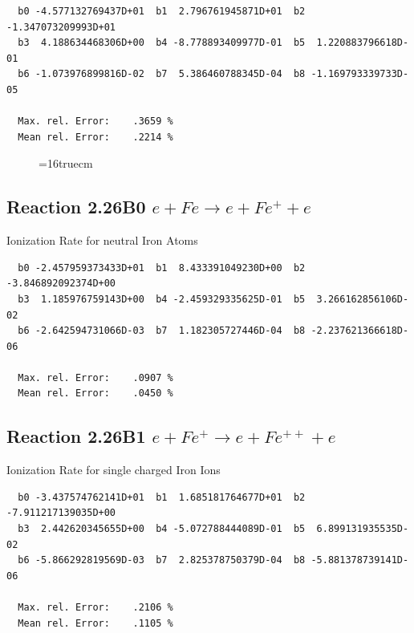 \documentclass[12pt,dvips]{article}
\begin{document}
\begin{small}\begin{verbatim}
  b0 -4.577132769437D+01  b1  2.796761945871D+01  b2 -1.347073209993D+01
  b3  4.188634468306D+00  b4 -8.778893409977D-01  b5  1.220883796618D-01
  b6 -1.073976899816D-02  b7  5.386460788345D-04  b8 -1.169793339733D-05

  Max. rel. Error:    .3659 %
  Mean rel. Error:    .2214 %

\end{verbatim}\end{small}


\begin{figure} \label{2.18B}
\epsfxsize=16truecm
\end{figure}
\newpage



\subsection{
Reaction 2.26B0   $e + Fe  \rightarrow e + Fe^+  + e$
}

  Ionization Rate for neutral Iron Atoms

\begin{small}\begin{verbatim}
  b0 -2.457959373433D+01  b1  8.433391049230D+00  b2 -3.846892092374D+00
  b3  1.185976759143D+00  b4 -2.459329335625D-01  b5  3.266162856106D-02
  b6 -2.642594731066D-03  b7  1.182305727446D-04  b8 -2.237621366618D-06

  Max. rel. Error:    .0907 %
  Mean rel. Error:    .0450 %

\end{verbatim}\end{small}



\subsection{
Reaction 2.26B1   $e + Fe^+ \rightarrow e + Fe^{++} + e$
}

  Ionization Rate for single charged Iron Ions

\begin{small}\begin{verbatim}
  b0 -3.437574762141D+01  b1  1.685181764677D+01  b2 -7.911217139035D+00
  b3  2.442620345655D+00  b4 -5.072788444089D-01  b5  6.899131935535D-02
  b6 -5.866292819569D-03  b7  2.825378750379D-04  b8 -5.881378739141D-06

  Max. rel. Error:    .2106 %
  Mean rel. Error:    .1105 %


\end{verbatim}\end{small}
\end{document}
